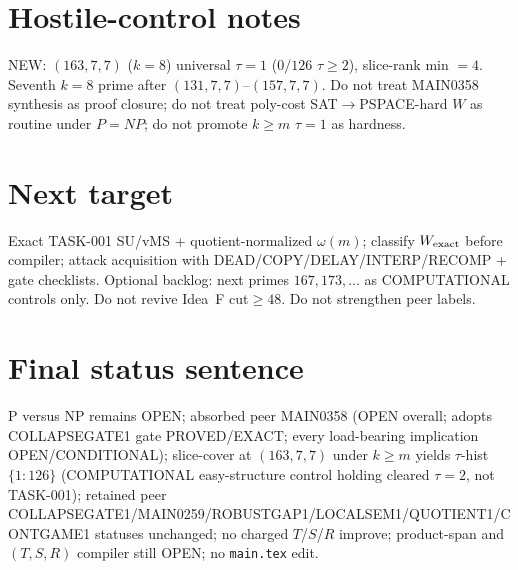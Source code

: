 \documentclass[11pt]{article}
\begin{document}
\section*{Hostile-control notes}
NEW: $(163,7,7)$ ($k{=}8$) universal $\tau{=}1$ ($0/126$ $\tau{\ge}2$), slice-rank min $=4$.
Seventh $k{=}8$ prime after $(131,7,7)$--$(157,7,7)$.
Do not treat MAIN0358 synthesis as proof closure; do not treat poly-cost SAT$\to$PSPACE-hard $W$ as routine under $P=NP$;
do not promote $k{\ge}m$ $\tau{=}1$ as hardness.

\section*{Next target}
Exact TASK-001 SU/vMS + quotient-normalized $\omega(m)$; classify $W_{\rm exact}$ before compiler;
attack acquisition with DEAD/COPY/DELAY/INTERP/RECOMP + gate checklists.
Optional backlog: next primes $167,173,\ldots$ as COMPUTATIONAL controls only.
Do not revive Idea~F cut$\ge48$. Do not strengthen peer labels.

\section*{Final status sentence}
P versus NP remains OPEN; absorbed peer MAIN0358 (OPEN overall; adopts COLLAPSEGATE1 gate PROVED/EXACT; every load-bearing implication OPEN/CONDITIONAL); slice-cover at $(163,7,7)$ under $k{\ge}m$ yields $\tau$-hist $\{1{:}126\}$ (COMPUTATIONAL easy-structure control holding cleared $\tau{=}2$, not TASK-001); retained peer COLLAPSEGATE1/MAIN0259/ROBUSTGAP1/LOCALSEM1/QUOTIENT1/CONTGAME1 statuses unchanged; no charged $T$/$S$/$R$ improve; product-span and $(T,S,R)$ compiler still OPEN; no \texttt{main.tex} edit.
\end{document}
